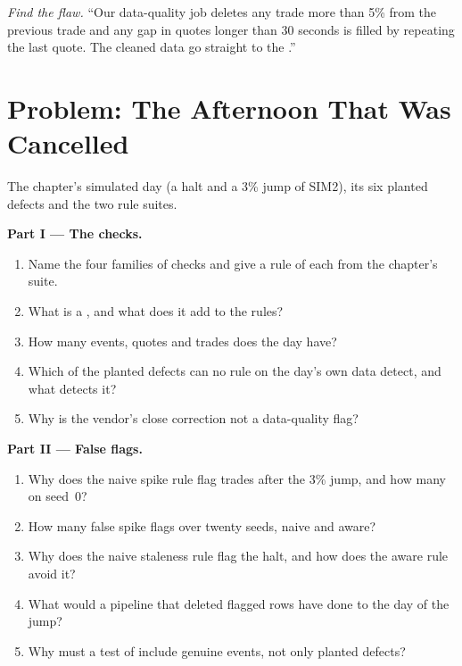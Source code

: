 \begin{exercise}[$\star\star\star$]\label{exo:pl:data-quality-and-lineage:8}
\emph{Find the flaw.} ``Our data-quality job deletes any trade more than 5\% from the previous trade and any gap in quotes longer than
30 seconds is filled by repeating the last quote. The cleaned data go straight to the .''
\end{exercise}

\section{Problem: The Afternoon That Was Cancelled}

\begin{problem}\label{pb:pl:data-quality-and-lineage:1}
The chapter's simulated day (a halt and a 3\% jump of SIM2), its six planted defects and the two rule suites.

\medskip\noindent\textbf{Part I --- The checks.}
\begin{enumerate}
\item Name the four families of checks and give a rule of each from the chapter's suite.
\item What is a , and what does it add to the rules?
\item How many events, quotes and trades does the day have?
\item Which of the planted defects can no rule on the day's own data detect, and what detects it?
\item Why is the vendor's close correction not a data-quality flag?
\end{enumerate}

\medskip\noindent\textbf{Part II --- False flags.}
\begin{enumerate}[resume]
\item Why does the naive spike rule flag trades after the 3\% jump, and how many on seed~0?
\item How many false spike flags over twenty seeds, naive and aware?
\item Why does the naive staleness rule flag the halt, and how does the aware rule avoid it?
\item What would a pipeline that deleted flagged rows have done to the day of the jump?
\item Why must a test of  include genuine events, not only planted defects?
\end{enumerate}


\end{problem}
